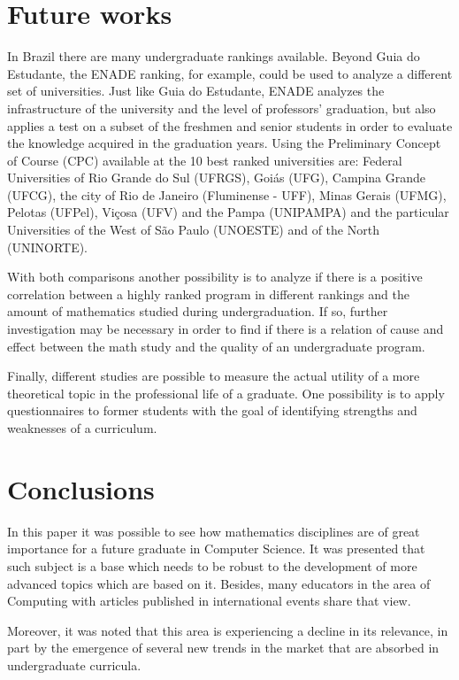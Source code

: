 \documentclass[conference]{IEEEtran}
\begin{document}
\section{Future works}
	In Brazil there are many undergraduate rankings available. Beyond Guia do Estudante, the ENADE ranking, for example, could be used to analyze a different set of universities. Just like Guia do Estudante, ENADE analyzes the infrastructure of the university and the level of professors' graduation, but also applies a test on a subset of the freshmen and senior students in order to evaluate the knowledge acquired in the graduation years. \cite{enade_info} Using the Preliminary Concept of Course (CPC) available at \cite{enade} the 10 best ranked universities are: Federal Universities of Rio Grande do Sul (UFRGS), Goiás (UFG), Campina Grande (UFCG), the city of Rio de Janeiro (Fluminense - UFF), Minas Gerais (UFMG), Pelotas (UFPel), Viçosa (UFV) and the Pampa (UNIPAMPA) and the particular Universities of the West of São Paulo (UNOESTE) and of the North (UNINORTE). 
	
	With both comparisons another possibility is to analyze if there is a positive correlation between a highly ranked program in different rankings and the amount of mathematics studied during undergraduation. If so, further investigation may be necessary in order to find if there is a relation of cause and effect between the math study and the quality of an undergraduate program.
	
	Finally, different studies are possible to measure the actual utility of a more theoretical topic in the professional life of a graduate. One possibility is to apply questionnaires to former students with the goal of identifying strengths and weaknesses of a curriculum.
	
	
\section{Conclusions}
	In this paper it was possible to see how mathematics disciplines are of great importance for a future graduate in Computer Science. It was presented that such subject is a base which needs to be robust to the development of more advanced topics which are based on it. Besides, many educators in the area of Computing with articles published in international events share that view.

	Moreover, it was noted that this area is experiencing a decline in its relevance, in part by the emergence of several new trends in the market that are absorbed in undergraduate curricula.
	
\end{document}
